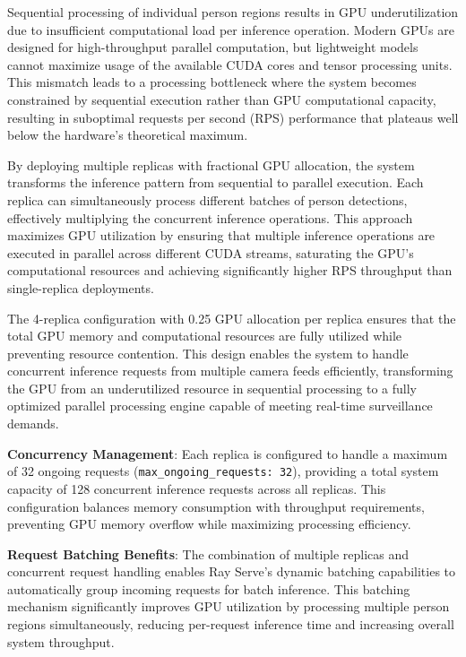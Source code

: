 Sequential processing of individual person regions results in GPU underutilization due to insufficient computational load per inference operation. Modern GPUs are designed for high-throughput parallel computation, but lightweight models cannot maximize usage of the available CUDA cores and tensor processing units. This mismatch leads to a processing bottleneck where the system becomes constrained by sequential execution rather than GPU computational capacity, resulting in suboptimal requests per second (RPS) performance that plateaus well below the hardware's theoretical maximum.

By deploying multiple replicas with fractional GPU allocation, the system transforms the inference pattern from sequential to parallel execution. Each replica can simultaneously process different batches of person detections, effectively multiplying the concurrent inference operations. This approach maximizes GPU utilization by ensuring that multiple inference operations are executed in parallel across different CUDA streams, saturating the GPU's computational resources and achieving significantly higher RPS throughput than single-replica deployments.

The 4-replica configuration with 0.25 GPU allocation per replica ensures that the total GPU memory and computational resources are fully utilized while preventing resource contention. This design enables the system to handle concurrent inference requests from multiple camera feeds efficiently, transforming the GPU from an underutilized resource in sequential processing to a fully optimized parallel processing engine capable of meeting real-time surveillance demands.

\textbf{Concurrency Management}: Each replica is configured to handle a maximum of 32 ongoing requests (\texttt{max\_ongoing\_requests: 32}), providing a total system capacity of 128 concurrent inference requests across all replicas. This configuration balances memory consumption with throughput requirements, preventing GPU memory overflow while maximizing processing efficiency.

\textbf{Request Batching Benefits}: The combination of multiple replicas and concurrent request handling enables Ray Serve's dynamic batching capabilities to automatically group incoming requests for batch inference. This batching mechanism significantly improves GPU utilization by processing multiple person regions simultaneously, reducing per-request inference time and increasing overall system throughput.

